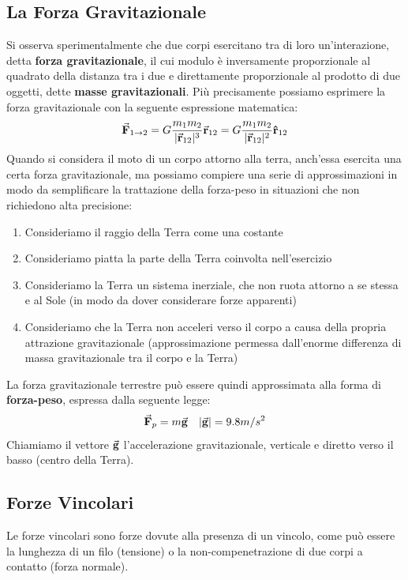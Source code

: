\documentclass{report}
\renewcommand{\r}{\va{r}}
\newcommand{\F}{\va{F}}
\begin{document}
\subsection{La Forza Gravitazionale}
Si osserva sperimentalmente che due corpi esercitano tra di loro un'interazione, detta \textbf{forza gravitazionale}, il cui modulo è inversamente proporzionale al quadrato della distanza tra i due e direttamente proporzionale al prodotto di due oggetti, dette \textbf{masse gravitazionali}. Più precisamente possiamo esprimere la forza gravitazionale con la seguente espressione matematica:
\[\F_{1\to2}=G\frac{m_1m_2}{|\r_{12}|^3}\r_{12}=G\frac{m_1m_2}{|\r_{12}|^2}\vu{r}_{12}\]
Quando si considera il moto di un corpo attorno alla terra, anch'essa esercita una certa forza gravitazionale, ma possiamo compiere una serie di approssimazioni in modo da semplificare la trattazione della forza-peso in situazioni che non richiedono alta precisione:
\begin{enumerate}
    \item Consideriamo il raggio della Terra come una costante
    \item Consideriamo piatta la parte della Terra coinvolta nell'esercizio
    \item Consideriamo la Terra un sistema inerziale, che non ruota attorno a se stessa e al Sole (in modo da dover considerare forze apparenti) 
    \item Consideriamo che la Terra non acceleri verso il corpo a causa della propria attrazione gravitazionale (approssimazione permessa dall'enorme differenza di massa gravitazionale tra il corpo e la Terra)
\end{enumerate}
La forza gravitazionale terrestre può essere quindi approssimata alla forma di \textbf{forza-peso}, espressa dalla seguente legge:
\[\F_p=m\va{g}\quad\abs{\va{g}}=9.8m/s^2\]
Chiamiamo il vettore $\va{g}$ l'accelerazione gravitazionale, verticale e diretto verso il basso (centro della Terra).
\subsection{Forze Vincolari}
Le forze vincolari sono forze dovute alla presenza di un vincolo, come può essere la lunghezza di un filo (tensione) o la non-compenetrazione di due corpi a contatto (forza normale). 
\end{document}
